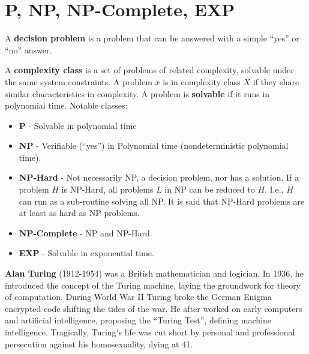 \section{P, NP, NP-Complete, EXP}

\label{sec:hard}
\begin{Def}

    A \textbf{decision problem} is a problem that can be answered with a simple ``yes'' or ``no'' answer.
\end{Def}

\begin{Def}

    A \textbf{complexity class} is a set of problems of related complexity,
    solvable under the same system constraints. A problem $x$ is in complexity class $X$ if they
    share similar characteristics in complexity. A problem is \textbf{solvable} if it runs 
    in polynomial time. Notable classes:

    \begin{itemize}
        \item \textbf{P} - Solvable in polynomial time
        \item \textbf{NP} - Verifiable (``yes'') in Polynomial time (nondeterministic polynomial time).
        \item \textbf{NP-Hard} - Not necessarily NP, a decision problem, nor has a solution. 
        If a problem $H$ is NP-Hard, all problems $L$ in NP can be reduced to $H$. I.e., $H$ can run as a sub-routine solving all NP.
        It is said that NP-Hard problems are at least as hard as NP problems.
        \item \textbf{NP-Complete} - NP and NP-Hard. 
        \item \textbf{EXP} - Solvable in exponential time.
    \end{itemize}

\end{Def}

\begin{Tip}
    \textbf{Alan Turing} (1912-1954) was a British mathematician and logician. In 1936, he introduced the concept of the Turing machine, laying the groundwork for theory of computation. During World War II Turing broke the German Enigma encrypted code shifting the tides of the war. He after worked on early computers and artificial intelligence, proposing the ``Turing Test'', defining machine intelligence. Tragically, Turing's life was cut short by personal and professional persecution against his homosexuality, dying at 41.
\end{Tip}

